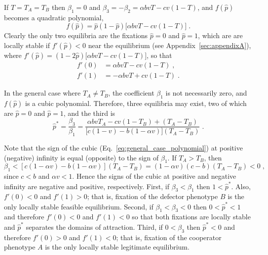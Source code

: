 \documentclass[12pt]{extarticle}
\begin{document}
\begin{appendices}
If $T=T_A=T_B$ then $\beta_1=0$ and $\beta_3=-\beta_2=\alpha b vT -cv(1-T)$, and $f(\hat{p})$ becomes a quadratic polynomial,
\begin{equation} \label{eq:equal_horizontal_transmission}
  f(\hat{p}) = \hat{p}(1-\hat{p})\big[\alpha bvT - cv(1-T)\big] \;.
\end{equation}
Clearly the only two equilibria are the fixations $\hat{p} =  0$ and $\hat{p} = 1$, which are are locally stable if $f'(\hat{p})<0$ near the equilibrium (see Appendix~\ref{sec:appendixA}), where
$f'(\hat{p})=(1-2\hat{p})\big[\alpha bvT - cv(1-T)\big]$, so that
\begin{equation} \label{eq:derivative_of_phattag-phat}
\begin{aligned}
	f'(0) &=	\alpha bvT - cv(1-T) \;, \\
	f'(1) &=	-\alpha bvT + cv(1-T) \;.
\end{aligned}
\end{equation}

In the general case where $T_A \neq T_B$, the coefficient $\beta_1$ is not necessarily zero, and $f(\hat{p})$ is a cubic polynomial.
Therefore, three equilibria may exist, two of which are
$\hat{p} = 0 $ and $\hat{p} = 1$, and the third is
\begin{equation} \label{eq:general_equilibrium_appendix}
  \hat{p}^* =  
  \frac{\beta_3}{\beta_1} =
  \frac{\alpha bvT_A - cv(1-T_B) + (T_A-T_B)}{\big[c(1-v) - b (1-\alpha v)\big] (T_A-T_B)} \;.
\end{equation}

Note that the sign of the cubic (Eq.\ \ref{eq:general_case_polynomial}) at positive (negative) infinity is equal (opposite) to the sign of $\beta_1$. 
If $T_A>T_B$, then 
\begin{equation} \label{eq:beta1}
   \beta_1 < [c(1-\alpha v) - b(1-\alpha v)] (T_A-T_B) 
   = (1-\alpha v)(c-b)(T_A-T_B) < 0 \;,
 \end{equation}
since $c<b$ and $\alpha v < 1$. Hence the signs of the cubic at positive and negative infinity are negative and positive, respectively.
First, if $\beta_3<\beta_1$ then 
$1<\hat{p}^*$. Also, $f'(0)<0$ and $f'(1)>0$; that is, fixation of the defector phenotype $B$ is the only locally stable feasible equilibrium.
Second, if $\beta_1<\beta_3<0$ then 
$0<\hat{p}^*<1$ and therefore $f'(0)<0$ and $f'(1)<0$ so that both fixations are locally stable and $\hat{p}^*$ separates the domains of attraction.
Third, if $0<\beta_3$ then 
$\hat{p}^*<0$ and therefore $f'(0)>0$ and $f'(1)<0$; that is, fixation of the cooperator phenotype $A$ is the only locally stable legitimate equilibrium.


\end{appendices}
\end{document}
